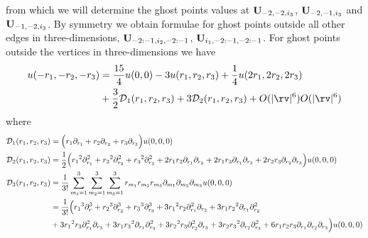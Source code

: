 \documentclass[12pt]{article}
\begin{document}
from which we will determine the ghost points values at $\mathbf{U}_{-2,-2,i_3}$, $\mathbf{U}_{-2,-1,i_3}$ and
 $\mathbf{U}_{-1,-2,i_3}$. By symmetry we obtain formulae for ghost points outside all other edges
in three-dimensions, $\mathbf{U}_{-2:-1,i_2,-2:-1}$, $\mathbf{U}_{i_1,-2:-1,-2:-1}$. For ghost points outside
the vertices in three-dimensions we have
\begin{align}
  u(-\ra,-\rb,-\rc) &= {15\over4} u(0,0) - 3 u(\ra,\rb,\rc) + {1\over 4}u(2\ra,2\rb,2\rc)\\
    &  + {3\over2}\Ds_1(\ra,\rb,\rc) 
                          + 3\Ds_2(\ra,\rb,\rc) + \trunc\trunc \label{eq:corner5}
\end{align}
where
\begin{align*}
  {\mathcal D}_1({r_1},{r_2},{r_3}) &= \Big({r_1} \partial_{r_1} + {r_2} \partial_{r_2} + {r_3}\partial_{r_3} \Big) u(0,0,0) \\
  {\mathcal D}_2({r_1},{r_2},{r_3}) &= {1\over2}\Big( {r_1}^2\partial_{r_1}^2+ {r_2}^2\partial_{r_2}^2+ {r_3}^2\partial_{r_3}^2
      +2{r_1} {r_2}\partial_{r_1}\partial_{r_2} + 2{r_1} {r_3}\partial_{r_1}\partial_{r_3} +2{r_2} {r_3}\partial_{r_2}\partial_{r_3} 
                       \Big)u(0,0,0)  \\
  {\mathcal D}_3({r_1},{r_2},{r_3}) &= {1\over3!}\sum_{m_1=1}^3\sum_{m_2=1}^3\sum_{m_3=1}^3
                         r_{m_1} r_{m_2} r_{m_3} \partial_{m_1}\partial_{m_2}\partial_{m_3} u(0,0,0) \\
                     &={1\over3!}\Big( {r_1}^3\partial_r^3+ {r_2}^3\partial_{r_2}^3+ {r_3}^3\partial_{r_3}^3
   +3 {r_1}^2 {r_2}\partial_{r_1}^2\partial_{r_2} + 3 {r_1}{r_2}^2\partial_{r_1}\partial_{r_2}^2  \\
  & +3 {r_1}^2 {r_3}\partial_{r_1}^2\partial_{r_3} + 3 {r_1}{r_3}^2\partial_{r_1}\partial_{r_3}^2 
   +3 {r_2}^2 {r_3}\partial_{r_2}^2\partial_{r_3}+ 3 {r_2}{r_3}^2\partial_{r_2}\partial_{r_3}^2 
   +6 {r_1}{r_2}{r_3} \partial_{r_1}\partial_{r_2}\partial_{r_3}  \Big) u(0,0,0)  
\end{align*}
\end{document}
